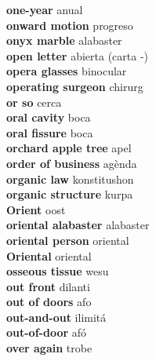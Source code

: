 \textbf{ one-year  } anual \\
\textbf{ onward motion  } progreso \\
\textbf{ onyx marble  } alabaster \\
\textbf{ open letter  } abierta (carta -) \\
\textbf{ opera glasses  } binocular \\
\textbf{ operating surgeon  } chirurg \\
\textbf{ or so  } cerca \\
\textbf{ oral cavity  } boca \\
\textbf{ oral fissure  } boca \\
\textbf{ orchard apple tree  } apel \\
\textbf{ order of business  } agènda \\
\textbf{ organic law  } konstitushon \\
\textbf{ organic structure  } kurpa \\
\textbf{ Orient  } oost \\
\textbf{ oriental alabaster  } alabaster \\
\textbf{ oriental person  } oriental \\
\textbf{ Oriental  } oriental \\
\textbf{ osseous tissue  } wesu \\
\textbf{ out front  } dilanti \\
\textbf{ out of doors  } afo \\
\textbf{ out-and-out  } ilimitá \\
\textbf{ out-of-door  } afó \\
\textbf{ over again  } trobe \\
